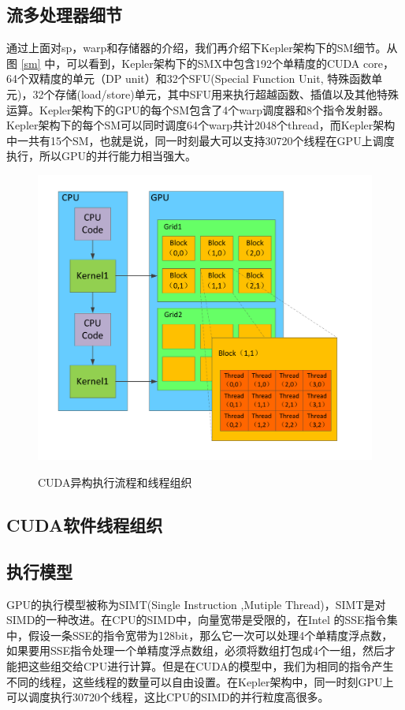 \subsection{流多处理器细节}
通过上面对sp，warp和存储器的介绍，我们再介绍下Kepler架构下的SM细节。从图 \ref{sm} 中，可以看到，Kepler架构下的SMX中包含192个单精度的CUDA core，64个双精度的单元（DP unit）和32个SFU(Special Function Unit, 特殊函数单元)，32个存储(load/store)单元，其中SFU用来执行超越函数、插值以及其他特殊运算。Kepler架构下的GPU的每个SM包含了4个warp调度器和8个指令发射器。 Kepler架构下的每个SM可以同时调度64个warp共计2048个thread，而Kepler架构中一共有15个SM，也就是说，同一时刻最大可以支持30720个线程在GPU上调度执行，所以GPU的并行能力相当强大。
\begin{figure}
\setlength{\abovecaptionskip}{-0.5cm}
\begin{center}
{\includegraphics[width=0.7 \textwidth]{figures/block.pdf}}
\end{center}
\caption{{\footnotesize{CUDA异构执行流程和线程组织}}}
\label{ktz}
\end{figure}
\subsection{CUDA软件线程组织}
\subsection{执行模型}
GPU的执行模型被称为SIMT(Single Instruction ,Mutiple Thread)，SIMT是对SIMD的一种改进。在CPU的SIMD中，向量宽带是受限的，在Intel 的SSE指令集中，假设一条SSE的指令宽带为128bit，那么它一次可以处理4个单精度浮点数，如果要用SSE指令处理一个单精度浮点数组，必须将数组打包成4个一组，然后才能把这些组交给CPU进行计算。但是在CUDA的模型中，我们为相同的指令产生不同的线程，这些线程的数量可以自由设置。在Kepler架构中，同一时刻GPU上可以调度执行30720个线程，这比CPU的SIMD的并行粒度高很多。

